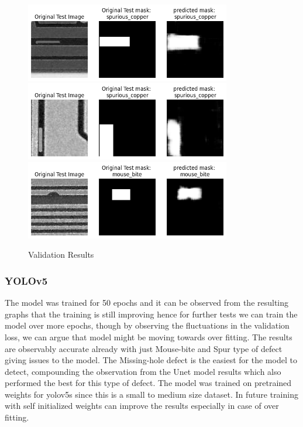 \documentclass[12pt]{article}
\begin{document}
\begin{figure}[h]
    \centering
    \includegraphics[width=0.8\textwidth]{./graphics/output4.png}
    \includegraphics[width=0.8\textwidth]{./graphics/output5.png}
    \includegraphics[width=0.8\textwidth]{./graphics/output6.png}
    \caption{Validation Results}
    \label{fig:results2_unet}
\end{figure}

\clearpage
\newpage

\subsubsection{YOLOv5}
The model was trained for 50 epochs and it can be observed from the resulting graphs that the training is still improving hence for further tests we can train the model over more epochs, though by observing the fluctuations in the validation loss, we can argue that model might be moving towards over fitting. The results are observably accurate already with just Mouse-bite and Spur type of defect giving issues to the model. The Missing-hole defect is the easiest for the model to detect, compounding the observation from the Unet model results which also performed the best for this type of defect.
The model was trained on pretrained weights for yolov5s since this is a small to medium size dataset. In future training with self initialized weights can improve the results especially in case of over fitting.
\end{document}
